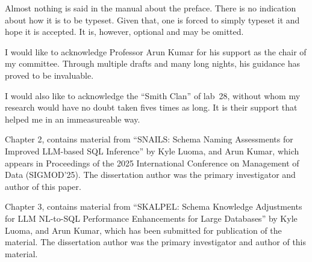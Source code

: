 \documentclass[12pt]{ucsddissertation}
\begin{document}
\tableofcontents
\listoffigures
\listoftables

\begin{preface}
Almost nothing is said in the manual about the preface. There is no
indication about how it is to be typeset. Given that, one is forced to
simply typeset it and hope it is accepted. It is, however, optional
and may be omitted.
\end{preface}

\begin{acknowledgements}
I would like to acknowledge Professor Arun Kumar for his support as the
chair of my committee. Through multiple drafts and many long nights,
his guidance has proved to be invaluable.

I would also like to acknowledge the ``Smith Clan'' of lab~28, without
whom my research would have no doubt taken fives times as long. It is
their support that helped me in an immeasureable way.

Chapter 2, contains material from ``SNAILS: Schema Naming Assessments for Improved LLM-based SQL Inference'' by Kyle Luoma, and Arun Kumar, which appears in Proceedings of the 2025 International Conference on Management of Data (SIGMOD'25). The dissertation author was the primary investigator and author of this paper.

Chapter 3, contains material from ``SKALPEL: Schema Knowledge Adjustments for LLM NL-to-SQL Performance Enhancements for Large Databases'' by Kyle Luoma, and Arun Kumar, which has been submitted for publication of the material. The dissertation author was the primary investigator and author of this material.
\end{acknowledgements}
\end{document}
